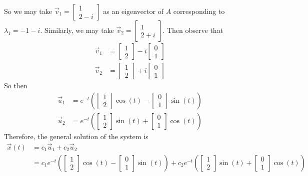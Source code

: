 \documentclass[11pt]{book}
\theoremstyle{definition}\newtheorem{definition}[subsection]{Definition}
\theoremstyle{definition}\newtheorem{example}[subsection]{Example}
\theoremstyle{definition}\newtheorem{notation}[subsection]{Notation}
\theoremstyle{definition}\newtheorem{remark}[subsection]{Remark}
\theoremstyle{theorem}\newtheorem{theorem}[subsection]{Theorem}
\theoremstyle{theorem}\newtheorem{lemma}[subsection]{Lemma}
\theoremstyle{theorem}\newtheorem{proposition}[subsection]{Proposition}
\theoremstyle{theorem}\newtheorem{corollary}[subsection]{Corollary}
\theoremstyle{theorem}\newtheorem{case}{Case}
\theoremstyle{remark}\newtheorem{subcase}{Subcase}[case]
\begin{document}
So we may take $\vec{v}_1 = \begin{bmatrix} 1 \\ 2 - i \end{bmatrix}$ as an eigenvector of $A$ corresponding to $\lambda_1 = -1 - i$. Similarly, we may take $\vec{v}_2 = \begin{bmatrix} 1 \\ 2 + i \end{bmatrix}$. Then observe that
\begin{align*}
    \vec{v}_1 &= \begin{bmatrix} 1 \\ 2 \end{bmatrix} - i\begin{bmatrix} 0 \\ 1 \end{bmatrix} \\
    \vec{v}_2 &= \begin{bmatrix} 1 \\ 2 \end{bmatrix} + i\begin{bmatrix} 0 \\ 1 \end{bmatrix}
\end{align*}
So then
\begin{align*}
    \vec{u}_1 &= e^{-t}\left(\begin{bmatrix} 1 \\ 2 \end{bmatrix}\cos(t) - \begin{bmatrix} 0 \\ 1 \end{bmatrix}\sin(t)\right) \\
    \vec{u}_2 &= e^{-t}\left(\begin{bmatrix} 1 \\ 2 \end{bmatrix}\sin(t) + \begin{bmatrix} 0 \\ 1 \end{bmatrix}\cos(t)\right)
\end{align*}
Therefore, the general solution of the system is
\begin{align*}
    \vec{x}(t) &= c_1\vec{u}_1 +  c_2\vec{u}_2 \\
    &= c_1e^{-t}\left(\begin{bmatrix} 1 \\ 2 \end{bmatrix}\cos(t) - \begin{bmatrix} 0 \\ 1 \end{bmatrix}\sin(t)\right) + c_2e^{-t}\left(\begin{bmatrix} 1 \\ 2 \end{bmatrix}\sin(t) + \begin{bmatrix} 0 \\ 1 \end{bmatrix}\cos(t)\right)
\end{align*}
\end{document}
